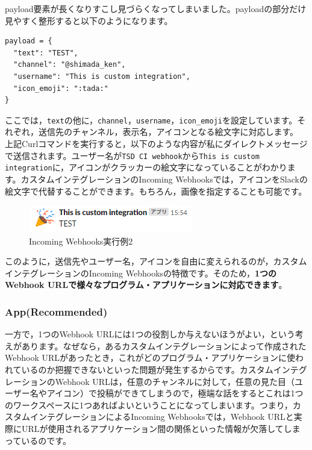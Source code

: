 \documentclass[uplatex,a4j]{jsarticle}
\begin{document}
payload要素が長くなりすこし見づらくなってしまいました。payloadの部分だけ見やすく整形すると以下のようになります。

\begin{lstlisting}[basicstyle=\ttfamily\footnotesize,frame=single,caption=Formed payload,label=formedpayload]
payload = {
  "text": "TEST",
  "channel": "@shimada_ken",
  "username": "This is custom integration",
  "icon_emoji": ":tada:"
}
\end{lstlisting}

ここでは，\verb|text|の他に，\verb|channel|，\verb|username|，\verb|icon_emoji|を設定しています。それぞれ，送信先のチャンネル，表示名，アイコンとなる絵文字に対応します。
上記Curlコマンドを実行すると，以下のような内容が私にダイレクトメッセージで送信されます。ユーザー名が\verb|TSD CI webhook|から\verb|This is custom integration|に，アイコンがクラッカーの絵文字になっていることがわかります。カスタムインテグレーションのIncoming Webhooksでは，アイコンをSlackの絵文字で代替することができます。もちろん，画像を指定することも可能です。

\begin{figure}[h]
 \centering
 \includegraphics[keepaspectratio, scale=0.8]{images/webhook_sample3.png}
 \caption{Incoming Webhooks実行例2}
 \label{fig:webhook_sample3}
\end{figure}

このように，送信先やユーザー名，アイコンを自由に変えられるのが，カスタムインテグレーションのIncoming Webhooksの特徴です。そのため，\textbf{1つのWebhook URLで様々なプログラム・アプリケーションに対応できます}。

\subsubsection{App(Recommended)}

一方で，1つのWebhook URLには1つの役割しか与えないほうがよい，という考えがあります。なぜなら，あるカスタムインテグレーションによって作成されたWebhook URLがあったとき，これがどのプログラム・アプリケーションに使われているのか把握できないといった問題が発生するからです。カスタムインテグレーションのWebhook URLは，任意のチャンネルに対して，任意の見た目（ユーザー名やアイコン）で投稿ができてしまうので，極端な話をするとこれは1つのワークスペースに1つあればよいということになってしまいます。つまり，カスタムインテグレーションによるIncoming Webhooksでは，Webhook URLと実際にURLが使用されるアプリケーション間の関係といった情報が欠落してしまっているのです。
\end{document}
